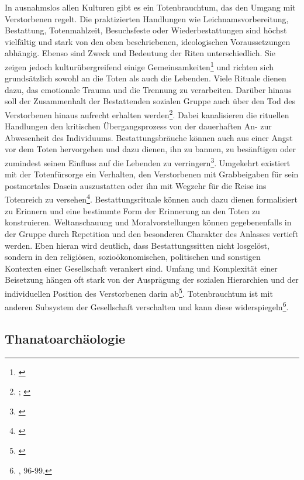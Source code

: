 \documentclass[openany,twoside,twocolumn]{book}
\let\rmarkdownfootnote\footnote%
\def\footnote{\protect\rmarkdownfootnote}
\begin{document}
In ausnahmslos allen Kulturen gibt es ein Totenbrauchtum, das den Umgang
mit Verstorbenen regelt. Die praktizierten Handlungen wie
Leichnamsvorbereitung, Bestattung, Totenmahlzeit, Besuchsfeste oder
Wiederbestattungen sind höchst vielfältig und stark von den oben
beschriebenen, ideologischen Voraussetzungen abhängig. Ebenso sind Zweck
und Bedeutung der Riten unterschiedlich. Sie zeigen jedoch
kulturübergreifend einige Gemeinsamkeiten\footnote{\textcite{macho_stichwort_1997}}
und richten sich grundsätzlich sowohl an die Toten als auch die
Lebenden. Viele Rituale dienen dazu, das emotionale Trauma und die
Trennung zu verarbeiten. Darüber hinaus soll der Zusammenhalt der
Bestattenden sozialen Gruppe auch über den Tod des Verstorbenen hinaus
aufrecht erhalten werden\footnote{\textcite{gladigow_naturae_1997};
  \textcite{hasenfratz_zum_1983}}. Dabei kanalisieren die rituellen
Handlungen den kritischen Übergangsprozess von der dauerhaften An- zur
Abwesenheit des Individuums. Bestattungsbräuche können auch aus einer
Angst vor dem Toten hervorgehen und dazu dienen, ihn zu bannen, zu
besänftigen oder zumindest seinen Einfluss auf die Lebenden zu
verringern\footnote{\textcite{lauf_im_1997}}. Umgekehrt existiert mit
der Totenfürsorge ein Verhalten, den Verstorbenen mit Grabbeigaben für
sein postmortales Dasein auszustatten oder ihn mit Wegzehr für die Reise
ins Totenreich zu versehen\footnote{\textcite{nebelsick_doppelte_1995}}.
Bestattungsrituale können auch dazu dienen formalisiert zu Erinnern und
eine bestimmte Form der Erinnerung an den Toten zu konstruieren.
Weltanschauung und Moralvorstellungen können gegebenenfalls in der
Gruppe durch Repetition und den besonderen Charakter des Anlasses
vertieft werden. Eben hieran wird deutlich, dass Bestattungssitten nicht
losgelöst, sondern in den religiösen, sozioökonomischen, politischen und
sonstigen Kontexten einer Gesellschaft verankert sind. Umfang und
Komplexität einer Beisetzung hängen oft stark von der Ausprägung der
sozialen Hierarchien und der individuellen Position des Verstorbenen
darin ab\footnote{\textcite{harke_final_1997}}. Totenbrauchtum ist mit
anderen Subsystem der Gesellschaft verschalten und kann diese
widerspiegeln\footnote{\textcite{hofmann_rituelle_2008}, 96-99.}.

\hypertarget{thanatoarchaologie}{%
\subsection{Thanatoarchäologie}\label{thanatoarchaologie}}
\end{document}
